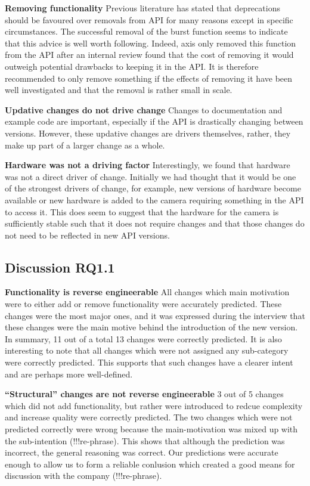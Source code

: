 \documentclass{sig-alternate}
\begin{document}
\smallskip \noindent
\textbf{Removing functionality  }
Previous literature has stated that deprecations should be favoured over removals from API for many reasons except in specific circumstances. The successful removal of the burst function seems to indicate that this advice is well worth following. Indeed, axis only removed this function from the API after an internal review found that the cost of removing it would outweigh potential drawbacks to keeping it in the API. It is therefore recommended to only remove something if the effects of removing it have been well investigated and that the removal is rather small in scale.  

\smallskip \noindent
\textbf{Updative changes do not drive change  }
Changes to documentation and example code are important, especially if the API is drastically changing between versions. However, these updative changes are drivers themselves, rather, they make up part of a larger change as a whole. 

\smallskip \noindent
\textbf{Hardware was not a driving factor  }
Interestingly, we found that hardware was not a direct driver of change. Initially we had thought that it would be one of the strongest drivers of change, for example, new versions of hardware become available or new hardware is added to the camera requiring something in the API to access it. This does seem to suggest that the hardware for the camera is sufficiently stable such that it does not require changes and that those changes do not need to be reflected in new API versions.


\subsection{Discussion RQ1.1}



\noindent
\textbf{Functionality is reverse engineerable  } 
All changes which main motivation were to either add or remove functionality were accurately predicted. These changes were the most major ones, and it was expressed during the interview that these changes were the main motive behind the introduction of the new version. In summary, 11 out of a total 13 changes were correctly predicted. It is also interesting to note that all changes which were not assigned any sub-category were correctly predicted. This supports that such changes have a clearer intent and are perhaps more well-defined. 

\smallskip \noindent
\textbf{``Structural'' changes are not reverse engineerable  }
3 out of 5 changes which did not add functionality, but rather were introduced to redcue complexity and increase quality were correctly predicted. The two changes which were not predicted correctly were wrong because the main-motivation was mixed up with the sub-intention (!!!re-phrase). This shows that although the prediction was incorrect, the general reasoning was correct. Our predictions were accurate enough to allow us to form a reliable conlusion which created a good means for discussion with the company (!!!re-phrase). 
\end{document}
